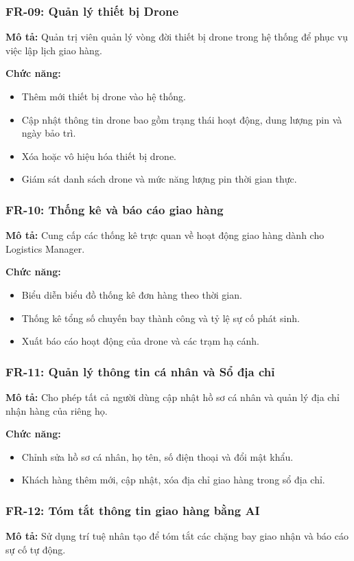 \subsubsection{FR-09: Quản lý thiết bị Drone}
\textbf{Mô tả:} Quản trị viên quản lý vòng đời thiết bị drone trong hệ thống để phục vụ việc lập lịch giao hàng.

\textbf{Chức năng:}
\begin{itemize}
  \item Thêm mới thiết bị drone vào hệ thống.
  \item Cập nhật thông tin drone bao gồm trạng thái hoạt động, dung lượng pin và ngày bảo trì.
  \item Xóa hoặc vô hiệu hóa thiết bị drone.
  \item Giám sát danh sách drone và mức năng lượng pin thời gian thực.
\end{itemize}

\subsubsection{FR-10: Thống kê và báo cáo giao hàng}
\textbf{Mô tả:} Cung cấp các thống kê trực quan về hoạt động giao hàng dành cho Logistics Manager.

\textbf{Chức năng:}
\begin{itemize}
  \item Biểu diễn biểu đồ thống kê đơn hàng theo thời gian.
  \item Thống kê tổng số chuyến bay thành công và tỷ lệ sự cố phát sinh.
  \item Xuất báo cáo hoạt động của drone và các trạm hạ cánh.
\end{itemize}

\subsubsection{FR-11: Quản lý thông tin cá nhân và Sổ địa chỉ}
\textbf{Mô tả:} Cho phép tất cả người dùng cập nhật hồ sơ cá nhân và quản lý địa chỉ nhận hàng của riêng họ.

\textbf{Chức năng:}
\begin{itemize}
  \item Chỉnh sửa hồ sơ cá nhân, họ tên, số điện thoại và đổi mật khẩu.
  \item Khách hàng thêm mới, cập nhật, xóa địa chỉ giao hàng trong sổ địa chỉ.
\end{itemize}

\subsubsection{FR-12: Tóm tắt thông tin giao hàng bằng AI}
\textbf{Mô tả:} Sử dụng trí tuệ nhân tạo để tóm tắt các chặng bay giao nhận và báo cáo sự cố tự động.

